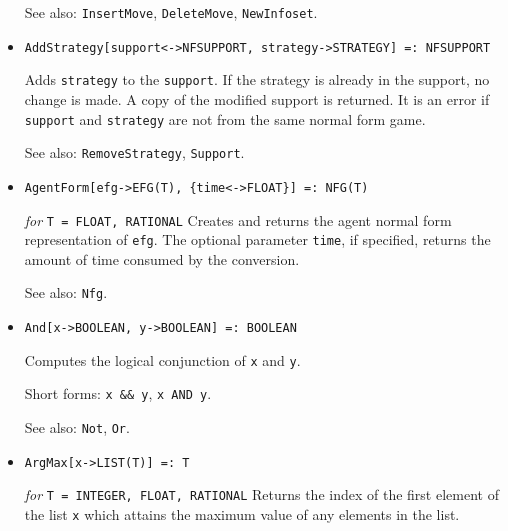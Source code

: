 \begin{itemize}
\item [See also:] \verb+InsertMove+, \verb+DeleteMove+,
\verb+NewInfoset+.  
\ed

\item{}
\protect \large \begin{verbatim}
AddStrategy[support<->NFSUPPORT, strategy->STRATEGY] =: NFSUPPORT
\end{verbatim}\normalsize

\bd
Adds \verb+strategy+ to the \verb+support+.  If the strategy is already
in the support, no change is made.  A copy of the modified support is
returned.  It is an error if \verb+support+ and \verb+strategy+ are not
from the same normal form game.

\item [See also:] \verb+RemoveStrategy+, \verb+Support+.
\ed

\item{}
\protect \large \begin{verbatim}
AgentForm[efg->EFG(T), {time<->FLOAT}] =: NFG(T)
\end{verbatim}\normalsize

{\it for} {\tt T = FLOAT, RATIONAL}
\bd
Creates and returns the agent normal form representation of \verb+efg+.
The optional parameter \verb+time+, if specified, returns the amount
of time consumed by the conversion.

\item [See also:] \verb+Nfg+.
\ed

\item{} 
\protect \large \begin{verbatim}
And[x->BOOLEAN, y->BOOLEAN] =: BOOLEAN
\end{verbatim} \normalsize

\bd
Computes the logical conjunction of \verb+x+ and \verb+y+.
\item [Short forms:] \verb+x && y+, \verb+x AND y+.
\item [See also:] \verb+Not+, \verb+Or+.
\ed



\item{} 
\protect \large \begin{verbatim}
ArgMax[x->LIST(T)] =: T 
\end{verbatim} \normalsize

{\it for} {\tt T = INTEGER, FLOAT, RATIONAL} 
\bd 
Returns the index of the first element of the list \verb+x+ which
attains the maximum value of any elements in the list.  
\ed


\end{itemize}
